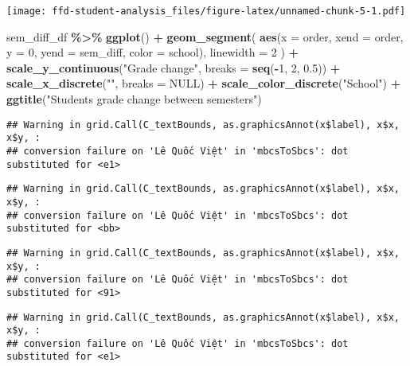 \documentclass[
]{article}
\newenvironment{Shaded}{\begin{snugshade}}{\end{snugshade}}
\newcommand{\AttributeTok}[1]{\textcolor[rgb]{0.13,0.29,0.53}{#1}}
\newcommand{\ConstantTok}[1]{\textcolor[rgb]{0.56,0.35,0.01}{#1}}
\newcommand{\DecValTok}[1]{\textcolor[rgb]{0.00,0.00,0.81}{#1}}
\newcommand{\FloatTok}[1]{\textcolor[rgb]{0.00,0.00,0.81}{#1}}
\newcommand{\FunctionTok}[1]{\textcolor[rgb]{0.13,0.29,0.53}{\textbf{#1}}}
\newcommand{\NormalTok}[1]{#1}
\newcommand{\SpecialCharTok}[1]{\textcolor[rgb]{0.81,0.36,0.00}{\textbf{#1}}}
\newcommand{\StringTok}[1]{\textcolor[rgb]{0.31,0.60,0.02}{#1}}
\begin{document}
\texttt{[image: ffd-student-analysis\_files/figure-latex/unnamed-chunk-5-1.pdf]}

\begin{Shaded}
\begin{Highlighting}[]
\NormalTok{sem\_diff\_df }\SpecialCharTok{\%\textgreater{}\%}
  \FunctionTok{ggplot}\NormalTok{() }\SpecialCharTok{+}
  \FunctionTok{geom\_segment}\NormalTok{(}
    \FunctionTok{aes}\NormalTok{(}\AttributeTok{x =}\NormalTok{ order, }\AttributeTok{xend =}\NormalTok{ order, }\AttributeTok{y =} \DecValTok{0}\NormalTok{, }\AttributeTok{yend =}\NormalTok{ sem\_diff, }\AttributeTok{color =}\NormalTok{ school),}
    \AttributeTok{linewidth =} \DecValTok{2}
\NormalTok{  ) }\SpecialCharTok{+}
  \FunctionTok{scale\_y\_continuous}\NormalTok{(}\StringTok{"Grade change"}\NormalTok{, }\AttributeTok{breaks =} \FunctionTok{seq}\NormalTok{(}\SpecialCharTok{{-}}\DecValTok{1}\NormalTok{, }\DecValTok{2}\NormalTok{, }\FloatTok{0.5}\NormalTok{)) }\SpecialCharTok{+}
  \FunctionTok{scale\_x\_discrete}\NormalTok{(}\StringTok{""}\NormalTok{, }\AttributeTok{breaks =} \ConstantTok{NULL}\NormalTok{) }\SpecialCharTok{+} 
  \FunctionTok{scale\_color\_discrete}\NormalTok{(}\StringTok{"School"}\NormalTok{) }\SpecialCharTok{+} 
  \FunctionTok{ggtitle}\NormalTok{(}\StringTok{"Student\textquotesingle{}s grade change between semesters"}\NormalTok{)}
\end{Highlighting}
\end{Shaded}

\begin{verbatim}
## Warning in grid.Call(C_textBounds, as.graphicsAnnot(x$label), x$x, x$y, :
## conversion failure on 'Lê Quốc Việt' in 'mbcsToSbcs': dot substituted for <e1>
\end{verbatim}

\begin{verbatim}
## Warning in grid.Call(C_textBounds, as.graphicsAnnot(x$label), x$x, x$y, :
## conversion failure on 'Lê Quốc Việt' in 'mbcsToSbcs': dot substituted for <bb>
\end{verbatim}

\begin{verbatim}
## Warning in grid.Call(C_textBounds, as.graphicsAnnot(x$label), x$x, x$y, :
## conversion failure on 'Lê Quốc Việt' in 'mbcsToSbcs': dot substituted for <91>
\end{verbatim}

\begin{verbatim}
## Warning in grid.Call(C_textBounds, as.graphicsAnnot(x$label), x$x, x$y, :
## conversion failure on 'Lê Quốc Việt' in 'mbcsToSbcs': dot substituted for <e1>
\end{verbatim}
\end{document}
